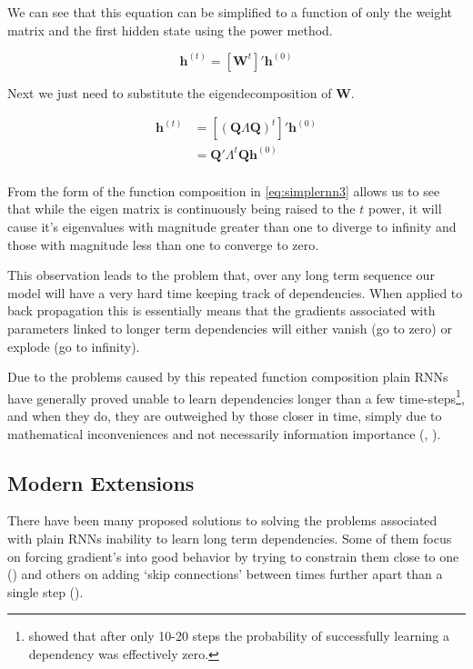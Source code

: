 \documentclass[]{book}
\let\rmarkdownfootnote\footnote%
\def\footnote{\protect\rmarkdownfootnote}
\theoremstyle{definition}
\theoremstyle{definition}
\theoremstyle{definition}
\theoremstyle{remark}
\begin{document}
We can see that this equation can be simplified to a function of only
the weight matrix and the first hidden state using the power method.

\begin{equation} 
  \textbf{h}^{(t)} = \left[\textbf{W}^t\right]' \textbf{h}^{(0)}
  \label{eq:simplernn2}
\end{equation}

Next we just need to substitute the eigendecomposition of
\(\textbf{W}\).

\begin{align} 
  \textbf{h}^{(t)} &= \left[(\textbf{Q}\Lambda\textbf{Q})^t\right]' \textbf{h}^{(0)} \\
                    &= \textbf{Q}'\Lambda^t \textbf{Q} \textbf{h}^{(0)} \\
  \label{eq:simplernn3}
\end{align}

From the form of the function composition in \eqref{eq:simplernn3} allows
us to see that while the eigen matrix is continuously being raised to
the \(t\) power, it will cause it's eigenvalues with magnitude greater
than one to diverge to infinity and those with magnitude less than one
to converge to zero.

This observation leads to the problem that, over any long term sequence
our model will have a very hard time keeping track of dependencies. When
applied to back propagation this is essentially means that the gradients
associated with parameters linked to longer term dependencies will
either vanish (go to zero) or explode (go to infinity).

Due to the problems caused by this repeated function composition plain
RNNs have generally proved unable to learn dependencies longer than a
few time-steps\footnote{\citet{bengio_gradient} showed that after only
  10-20 steps the probability of successfully learning a dependency was
  effectively zero.}, and when they do, they are outweighed by those
closer in time, simply due to mathematical inconveniences and not
necessarily information importance (\citet{bengio_gradient},
\citet{graves_rnn}).

\subsection{Modern Extensions}\label{modern-extensions}

There have been many proposed solutions to solving the problems
associated with plain RNNs inability to learn long term dependencies.
Some of them focus on forcing gradient's into good behavior by trying to
constrain them close to one (\citet{bounded_gradient_rnn}) and others on
adding `skip connections' between times further apart than a single step
(\citet{skip_connections}).
\end{document}
